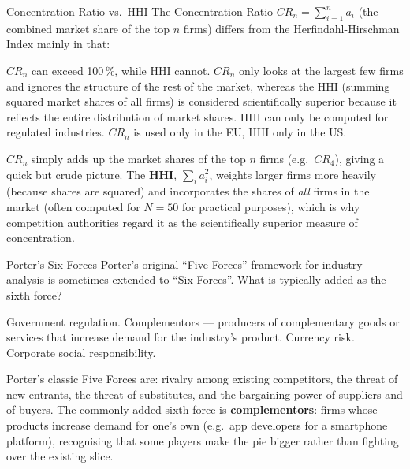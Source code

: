 \begin{question}[type=mc]{Concentration Ratio vs.\ HHI}
The Concentration Ratio $CR_n = \sum_{i=1}^n a_i$ (the combined market share
of the top $n$ firms) differs from the Herfindahl-Hirschman Index mainly in
that:
\begin{choices}
  \choice        $CR_n$ can exceed 100\,\%, while HHI cannot.
  \correctchoice $CR_n$ only looks at the largest few firms and ignores the
                 structure of the rest of the market, whereas the HHI
                 (summing squared market shares of all firms) is considered
                 scientifically superior because it reflects the entire
                 distribution of market shares.
  \choice        HHI can only be computed for regulated industries.
  \choice        $CR_n$ is used only in the EU, HHI only in the US.
\end{choices}
\begin{solution}
  $CR_n$ simply adds up the market shares of the top $n$ firms (e.g.\
  $CR_4$), giving a quick but crude picture. The \textbf{HHI}, $\sum_i
  a_i^2$, weights larger firms more heavily (because shares are squared) and
  incorporates the shares of \emph{all} firms in the market (often computed
  for $N=50$ for practical purposes), which is why competition authorities
  regard it as the scientifically superior measure of concentration.
\end{solution}
\end{question}

\begin{question}[type=mc]{Porter's Six Forces}
Porter's original ``Five Forces'' framework for industry analysis is
sometimes extended to ``Six Forces''. What is typically added as the sixth
force?
\begin{choices}
  \choice        Government regulation.
  \correctchoice Complementors --- producers of complementary goods or
                 services that increase demand for the industry's product.
  \choice        Currency risk.
  \choice        Corporate social responsibility.
\end{choices}
\begin{solution}
  Porter's classic Five Forces are: rivalry among existing competitors, the
  threat of new entrants, the threat of substitutes, and the bargaining
  power of suppliers and of buyers. The commonly added sixth force is
  \textbf{complementors}: firms whose products increase demand for one's
  own (e.g.\ app developers for a smartphone platform), recognising that
  some players make the pie bigger rather than fighting over the existing
  slice.
\end{solution}
\end{question}


